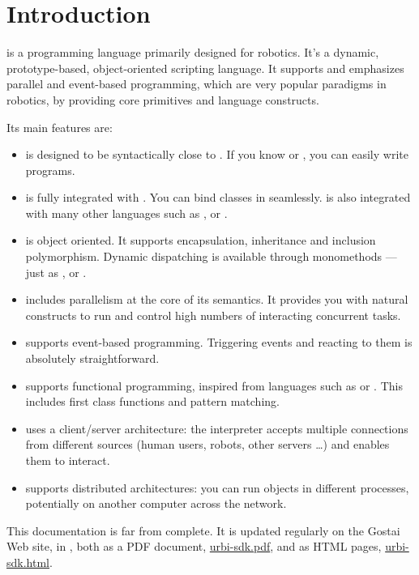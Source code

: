 \chapter*{Introduction}

\us is a programming language primarily designed for robotics. It's a
dynamic, prototype-based, object-oriented scripting language. It
supports and emphasizes parallel and event-based programming, which
are very popular paradigms in robotics, by providing core primitives
and language constructs.

Its main features are:
\begin{itemize}
\item \us is designed to be syntactically close to \Cxx. If you know
  \C or \Cxx, you can easily write \us programs.
\item \us is fully integrated with \Cxx. You can bind \Cxx classes
  in \us seamlessly. \us is also integrated with many other
  languages such as \java, \matlab or \python.
\item \us is object oriented. It supports encapsulation, inheritance
  and inclusion polymorphism. Dynamic dispatching is available through
  monomethods --- just as \Cxx, \Cs or \java.
\item \us includes parallelism at the core of its semantics. It
  provides you with natural constructs to run and control high numbers
  of interacting concurrent tasks.
\item \us supports event-based programming. Triggering events and
  reacting to them is absolutely straightforward.
\item \us supports functional programming, inspired from languages
  such as \lisp or \caml. This includes first class functions and
  pattern matching.
\item \us uses a client/server architecture: the interpreter accepts
  multiple connections from different sources (human users, robots,
  other servers \ldots) and enables them to interact.
\item \us supports distributed architectures: you can run objects in
  different processes, potentially on another computer across the
  network.
\end{itemize}

This documentation is far from complete.  It is updated regularly on
the Gostai Web site, in \href{\docurl}{\docurl}, both as a PDF
document, \href{\docurl/urbi-sdk.pdf}{urbi-sdk.pdf}, and as HTML
pages, \href{\docurl/urbi-sdk.html}{urbi-sdk.html}.


